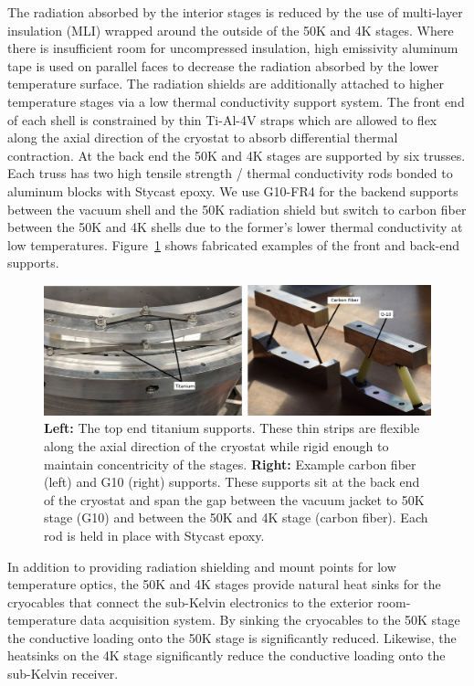 \documentclass[]{spie}  %
\begin{document}
The radiation absorbed by the interior stages is reduced by the use of
multi-layer insulation (MLI) wrapped around the outside of the 50K and 4K stages. Where
there is insufficient room for uncompressed insulation, high emissivity
aluminum tape is used on parallel faces to decrease the radiation absorbed by the lower
temperature surface. The radiation shields are additionally attached to higher temperature stages
via a low thermal conductivity support system. The front end of each shell is
constrained by thin Ti-Al-4V straps which are allowed to flex along the axial
direction of the cryostat to absorb differential thermal contraction. At the
back end the 50K and 4K stages are supported by six trusses. Each truss has two high
tensile strength / thermal conductivity rods bonded to aluminum blocks with
Stycast epoxy. We use G10-FR4 for the backend supports between the vacuum
shell and the 50K radiation shield but switch to carbon fiber between the 50K
and 4K shells due to the former's lower thermal conductivity at low
temperatures. Figure~\ref{fig:supports} shows fabricated examples of the
front and back-end supports.

\begin{figure}[t]
	\center
	\includegraphics[scale=0.1]{supports.png}
	\caption{\textbf{Left:} The top end titanium supports. These thin strips
	are flexible along the axial direction of the cryostat while rigid enough
	to maintain concentricity of the stages. \textbf{Right:} Example carbon fiber (left) and G10 (right) supports. These
	supports sit at the back end of the cryostat and span the gap between the
	vacuum jacket to 50K stage (G10) and between the 50K and 4K stage (carbon
	fiber). Each rod is held in place with Stycast epoxy.}
	\label{fig:supports}
\end{figure}



In addition to providing radiation shielding and mount points for low
temperature optics, the 50K and 4K stages provide natural heat sinks for the
cryocables that connect the sub-Kelvin electronics to the exterior
room-temperature data acquisition system. By sinking the cryocables to the 50K
stage the conductive loading onto the 50K stage is significantly reduced.
Likewise, the heatsinks on the 4K stage significantly reduce the conductive
loading onto the sub-Kelvin receiver. 
\end{document}
